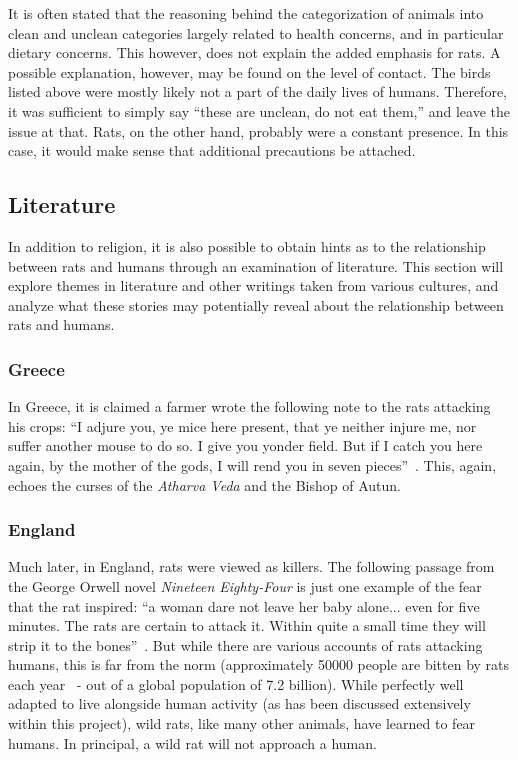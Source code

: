 \documentclass[12pt]{article}
\begin{document}
It is often stated that the reasoning behind the categorization of animals into clean and unclean categories largely related to health concerns, and in particular dietary concerns. This however, does not explain the added emphasis for rats. A possible explanation, however, may be found on the level of contact. The birds listed above were mostly likely not a part of the daily lives of humans. Therefore, it was sufficient to simply say ``these are unclean, do not eat them,'' and leave the issue at that. Rats, on the other hand, probably were a constant presence. In this case, it would make sense that additional precautions be attached.

\subsection{Literature} \label{Literature}

In addition to religion, it is also possible to obtain hints as to the relationship between rats and humans through an examination of literature. This section will explore themes in literature and other writings taken from various cultures, and analyze what these stories may potentially reveal about the relationship between rats and humans.

\subsubsection{Greece} \label{Greece}

In Greece, it is claimed a farmer wrote the following note to the rats attacking his crops: ``I adjure you, ye mice here present, that ye neither injure me, nor suffer another mouse to do so. I give you yonder field. But if I catch you here again, by the mother of the gods, I will rend you in seven pieces''~\cite{Barnett2001}. This, again, echoes the curses of the \textit{Atharva Veda} and the Bishop of Autun.

\subsubsection{England} \label{England}

Much later, in England, rats were viewed as killers. The following passage from the George Orwell novel \textit{Nineteen Eighty-Four} is just one example of the fear that the rat inspired: ``a woman dare not leave her baby alone... even for five minutes. The rats are certain to attack it. Within quite a small time they will strip it to the bones''~\cite{Barnett2001}. But while there are various accounts of rats attacking humans, this is far from the norm (approximately 50000 people are bitten by rats each year~\cite{Sullivan2004} - out of a global population of 7.2 billion). While perfectly well adapted to live alongside human activity (as has been discussed extensively within this project), wild rats, like many other animals, have learned to fear humans. In principal, a wild rat will not approach a human.
\end{document}
